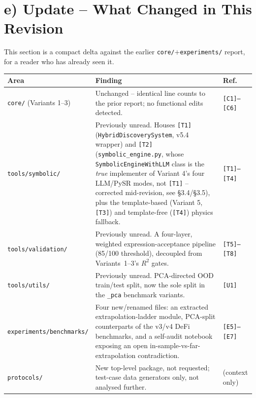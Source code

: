 \documentclass[11pt,a4paper]{article}
\newcommand{\code}[1]{\texttt{\small #1}}
\begin{document}
\section{e) Update -- What Changed in This Revision}
This section is a compact delta against the earlier \code{core/}$+$\code{experiments/}
report, for a reader who has already seen it.

\begin{center}
\renewcommand{\arraystretch}{1.2}
\begin{tabular}{@{}p{3.4cm}p{7.6cm}p{3.9cm}@{}}
\toprule
\textbf{Area} & \textbf{Finding} & \textbf{Ref.} \\
\midrule
\code{core/} (Variants 1--3) & Unchanged -- identical line counts to the
  prior report; no functional edits detected. & \code{[C1]--[C6]} \\
\addlinespace
\code{tools/symbolic/} & Previously unread. Houses \code{[T1]}
  (\code{HybridDiscoverySystem}, v5.4 wrapper) and \code{[T2]}
  (\code{symbolic\_engine.py}, whose \code{SymbolicEngineWithLLM} class is
  the \emph{true} implementer of Variant 4's four LLM/PySR modes, not
  \code{[T1]} -- corrected mid-revision, see \S3.4/\S3.5), plus the
  template-based (Variant 5, \code{[T3]}) and template-free (\code{[T4]})
  physics fallback. & \code{[T1]--[T4]} \\
\addlinespace
\code{tools/validation/} & Previously unread. A four-layer, weighted
  expression-acceptance pipeline (85/100 threshold), decoupled from
  Variants~1--3's $R^2$ gates. & \code{[T5]--[T8]} \\
\addlinespace
\code{tools/utils/} & Previously unread. PCA-directed OOD train/test
  split, now the sole split in the \code{\_pca} benchmark variants. &
  \code{[U1]} \\
\addlinespace
\code{experiments/benchmarks/} & Four new/renamed files: an extracted
  extrapolation-ladder module, PCA-split counterparts of the v3/v4 DeFi
  benchmarks, and a self-audit notebook exposing an open
  in-sample-vs-far-extrapolation contradiction. & \code{[E5]--[E7]} \\
\addlinespace
\code{protocols/} & New top-level package, not requested; test-case data
  generators only, not analysed further. & (context only) \\
\bottomrule
\end{tabular}
\end{center}
\end{document}
